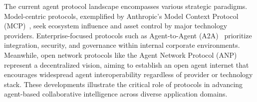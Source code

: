 \documentclass[10pt,preprint]{article}
\begin{document}
The current agent protocol landscape encompasses various strategic paradigms. Model-centric protocols, exemplified by Anthropic's Model Context Protocol (MCP)~\citep{anthropic2025}, seek ecosystem influence and asset control by major technology providers. Enterprise-focused protocols such as Agent-to-Agent (A2A)~\citep{a2a2025} prioritize integration, security, and governance within internal corporate environments. Meanwhile, open network protocols like the Agent Network Protocol (ANP)~\citep{anp2024} represent a decentralized vision, aiming to establish an open agent internet that encourages widespread agent interoperability regardless of provider or technology stack. These developments illustrate the critical role of protocols in advancing agent-based collaborative intelligence across diverse application domains.


%     



\end{document}
